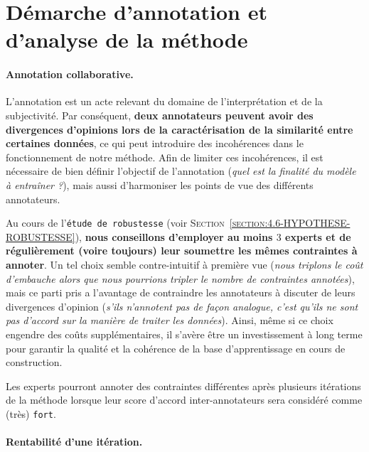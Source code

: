 	\section{Démarche d'annotation et d'analyse de la méthode}
	\label{section:5.3-GUIDE-UTILISER}
	
		\paragraph{\textcolor{colorSilverLakeBlue}{\faCheckSquare} Annotation collaborative.}
			
			L'annotation est un acte relevant du domaine de l'interprétation et de la subjectivité.
			Par conséquent, \textbf{deux annotateurs peuvent avoir des divergences d'opinions lors de la caractérisation de la similarité entre certaines données}, ce qui peut introduire des incohérences dans le fonctionnement de notre méthode.
			Afin de limiter ces incohérences, il est nécessaire de bien définir l'objectif de l'annotation (\textit{quel est la finalité du modèle à entraîner ?}), mais aussi d'harmoniser les points de vue des différents annotateurs.
			
			Au cours de l'\texttt{étude de robustesse} (voir \textsc{Section~\ref{section:4.6-HYPOTHESE-ROBUSTESSE}}), \textbf{nous conseillons d'employer au moins $3$ experts et de régulièrement (voire toujours) leur soumettre les mêmes contraintes à annoter}.
			Un tel choix semble contre-intuitif à première vue (\textit{nous triplons le coût d'embauche alors que nous pourrions tripler le nombre de contraintes annotées}), mais ce parti pris a l'avantage de contraindre les annotateurs à discuter de leurs divergences d'opinion (\textit{s'ils n'annotent pas de façon analogue, c'est qu'ils ne sont pas d'accord sur la manière de traiter les données}).
			Ainsi, même si ce choix engendre des coûts supplémentaires, il s'avère être un investissement à long terme pour garantir la qualité et la cohérence de la base d'apprentissage en cours de construction.
			
			Les experts pourront annoter des contraintes différentes après plusieurs itérations de la méthode lorsque leur score d'accord inter-annotateurs sera considéré comme (très) \texttt{fort}.
		
		
		\paragraph{\textcolor{colorSilverLakeBlue}{\faCheckSquare} Rentabilité d'une itération.}
			
